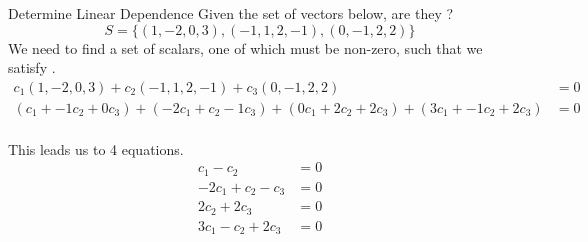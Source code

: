 \begin{example}{Determine Linear Dependence}
  Given the set of vectors below, are they ?
  \begin{equation*}
    S = \lbrace (1, -2, 0, 3), (-1, 1, 2, -1), (0, -1, 2, 2) \rbrace
  \end{equation*}
  \tcblower{}
  We need to find a set of scalars, one of which must be non-zero, such that we satisfy .
  \begin{align*}
    c_{1}(1, -2, 0, 3) + c_{2}(-1, 1, 2, -1) + c_{3}(0, -1, 2, 2) &= 0 \\
    (c_{1} + -1c_{2} + 0c_{3}) + (-2c_{1}+ c_{2} -1c_{3}) + (0c_{1} + 2c_{2} + 2c_{3}) + (3c_{1} + -1c_{2} + 2c_{3}) &= 0 \\
  \end{align*}

  This leads us to 4 equations.
  \begin{align*}
    c_{1} - c_{2} &= 0 \\
    -2c_{1} + c_{2} -c_{3} &= 0 \\
    2c_{2} + 2c_{3} &= 0 \\
    3c_{1} -c_{2} + 2c_{3} &= 0
  \end{align*}


\end{example}
